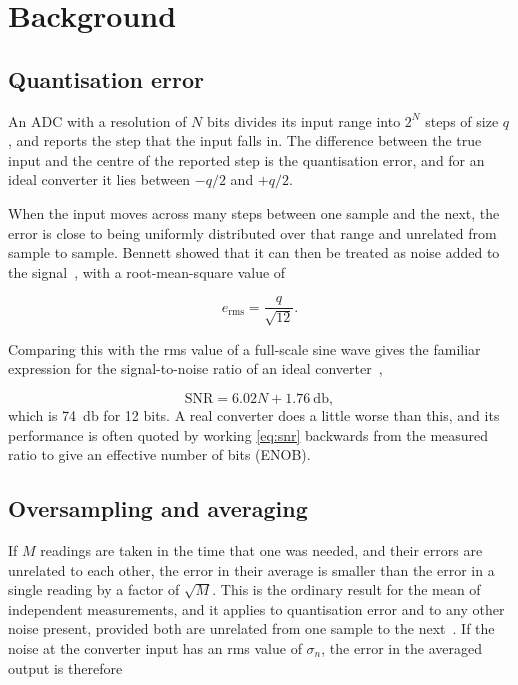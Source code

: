 
\section{Background}
\label{sec:background}

\subsection{Quantisation error}

An ADC with a resolution of $N$ bits divides its input range into $2^N$ steps
of size $q$, and reports the step that the input falls in. The difference
between the true input and the centre of the reported step is the
quantisation error, and for an ideal converter it lies between $-q/2$ and
$+q/2$.

When the input moves across many steps between one sample and the next, the
error is close to being uniformly distributed over that range and unrelated
from sample to sample. Bennett showed that it can then be treated as noise
added to the signal~\cite{bennett_1948}, with a root-mean-square value of

\begin{equation}
  \label{eq:quantisationNoise}
  e_{\mathrm{rms}} = \frac{q}{\sqrt{12}}.
\end{equation}

Comparing this with the rms value of a full-scale sine wave gives the familiar
expression for the signal-to-noise ratio of an ideal
converter~\cite{kester_2005},

\begin{equation}
  \label{eq:snr}
  \mathrm{SNR} = 6.02N + 1.76~\unit{\decibel},
\end{equation}
which is \qty{74}{\decibel} for 12 bits. A real converter does a little worse
than this, and its performance is often quoted by working
\cref{eq:snr} backwards from the measured ratio to give an effective number of
bits (ENOB).

\subsection{Oversampling and averaging}

If $M$ readings are taken in the time that one was needed, and their errors
are unrelated to each other, the error in their average is smaller than the
error in a single reading by a factor of $\sqrt{M}$. This is the ordinary
result for the mean of independent measurements, and it applies to
quantisation error and to any other noise present, provided both are
unrelated from one sample to the next~\cite{oppenheim_schafer_2010}. If the
noise at the converter input has an rms value of $\sigma_n$, the error in the
averaged output is therefore

